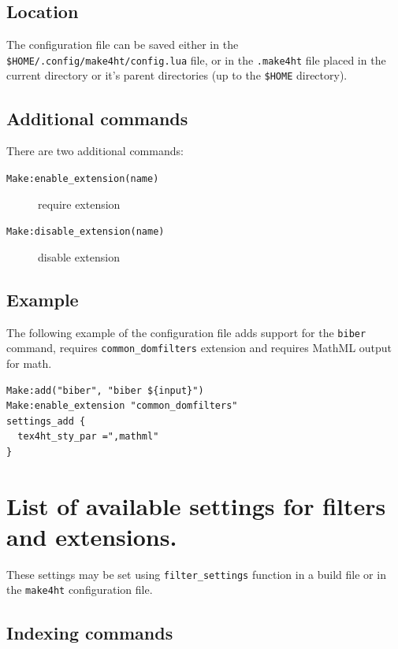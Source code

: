 \subsection{Location}\label{location}

The configuration file can be saved either in the
\texttt{\$HOME/.config/make4ht/config.lua} file, or in the
\texttt{.make4ht} file placed in the current directory or it's parent
directories (up to the \texttt{\$HOME} directory).

\subsection{Additional commands}\label{additional-commands}

There are two additional commands:

\begin{description}
\item[\texttt{Make:enable\_extension(name)}]
require extension
\item[\texttt{Make:disable\_extension(name)}]
disable extension
\end{description}

\subsection{Example}\label{example}

The following example of the configuration file adds support for the
\texttt{biber} command, requires \texttt{common\_domfilters} extension
and requires MathML output for math.

\begin{verbatim}
Make:add("biber", "biber ${input}")
Make:enable_extension "common_domfilters"
settings_add {
  tex4ht_sty_par =",mathml"
}
\end{verbatim}

\section{List of available settings for filters and
extensions.}\label{list-of-available-settings-for-filters-and-extensions.}

These settings may be set using \texttt{filter\_settings} function in a
build file or in the \texttt{make4ht} configuration file.

\subsection{Indexing commands}\label{indexing-commands}

